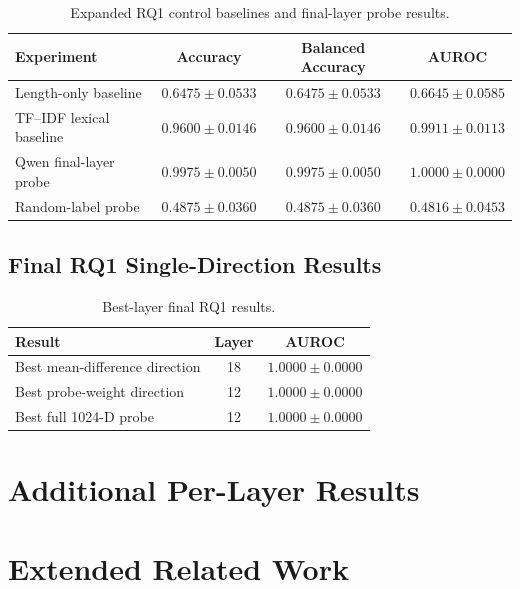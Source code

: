 \documentclass[11pt]{article}
\begin{document}
\begin{table}[H]
    \centering
    \begin{tabular}{lccc}
        \toprule
        Experiment & Accuracy & Balanced Accuracy & AUROC \\
        \midrule
        Length-only baseline &
        \(0.6475 \pm 0.0533\) &
        \(0.6475 \pm 0.0533\) &
        \(0.6645 \pm 0.0585\) \\
        TF--IDF lexical baseline &
        \(0.9600 \pm 0.0146\) &
        \(0.9600 \pm 0.0146\) &
        \(0.9911 \pm 0.0113\) \\
        Qwen final-layer probe &
        \(0.9975 \pm 0.0050\) &
        \(0.9975 \pm 0.0050\) &
        \(1.0000 \pm 0.0000\) \\
        Random-label probe &
        \(0.4875 \pm 0.0360\) &
        \(0.4875 \pm 0.0360\) &
        \(0.4816 \pm 0.0453\) \\
        \bottomrule
    \end{tabular}
    \caption{Expanded RQ1 control baselines and final-layer probe results.}
    \label{tab:appendix-expanded-baselines}
\end{table}


\subsection{Final RQ1 Single-Direction Results}

\begin{table}[H]
    \centering
    \begin{tabular}{lcc}
        \toprule
        Result & Layer & AUROC \\
        \midrule
        Best mean-difference direction & 18 & \(1.0000 \pm 0.0000\) \\
        Best probe-weight direction & 12 & \(1.0000 \pm 0.0000\) \\
        Best full 1024-D probe & 12 & \(1.0000 \pm 0.0000\) \\
        \bottomrule
    \end{tabular}
    \caption{Best-layer final RQ1 results.}
    \label{tab:appendix-rq1-final-best}
\end{table}

\section{Additional Per-Layer Results}



\section{Extended Related Work}
\end{document}
